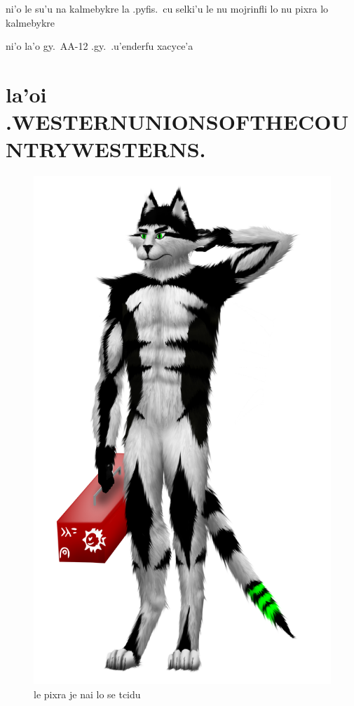 \documentclass{report}
\begin{document}
ni'o le su'u na kalmebykre la .pyfis.\ cu selki'u le nu mojrinfli lo nu pixra lo kalmebykre

ni'o la'o gy.\ AA-12 .gy.\ .u'enderfu xacyce'a

\chapter{la'oi .WESTERNUNIONSOFTHECOUNTRYWESTERNS.}
\begin{figure}[ht]
	\centering
	\includegraphics[keepaspectratio, width=\textwidth, height=0.75\textheight]{50x/toolbox/westernunionsofthecountrywesterns.png}
	\caption[center]{le pixra je nai lo se tcidu}
\end{figure}
\end{document}
